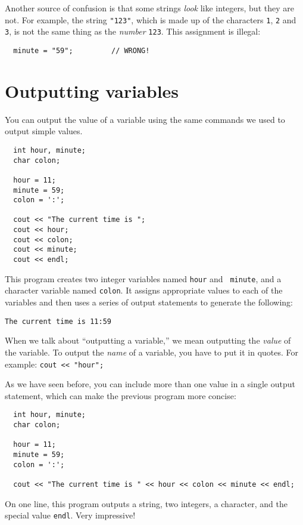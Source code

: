 Another source of confusion is that some strings {\em look}
like integers, but they are not.  For example,
the string {\tt "123"}, which is made up of the
characters {\tt 1}, {\tt 2} and {\tt 3}, is not
the same thing as the {\em number} {\tt 123}.
This assignment is illegal:

\begin{verbatim}
  minute = "59";         // WRONG!
\end{verbatim}
%
\section{Outputting variables}
\label{output}

You can output the value of a variable using the same commands
we used to output simple values.

\begin{verbatim}
  int hour, minute;
  char colon;

  hour = 11;
  minute = 59;
  colon = ':';

  cout << "The current time is ";
  cout << hour;
  cout << colon;
  cout << minute;
  cout << endl;
\end{verbatim}
%
This program creates two integer variables named {\tt hour} and {\tt
minute}, and a character variable named {\tt colon}.  It assigns
appropriate values to each of the variables and then uses a series
of output statements to generate the following:

\begin{verbatim}
The current time is 11:59
\end{verbatim}

When we talk about ``outputting a variable,'' we mean outputting the
{\em value} of the variable.  To output the {\em name} of a variable,
you have to put it in quotes.  For example: {\tt cout << "hour";}

As we have seen before, you can include more than one value in
a single output statement, which can make the previous program more
concise:

\begin{verbatim}
  int hour, minute;
  char colon;

  hour = 11;
  minute = 59;
  colon = ':';

  cout << "The current time is " << hour << colon << minute << endl;
\end{verbatim}
%
On one line, this program outputs a string, two integers, a character,
and the special value {\tt endl}.  Very impressive!

